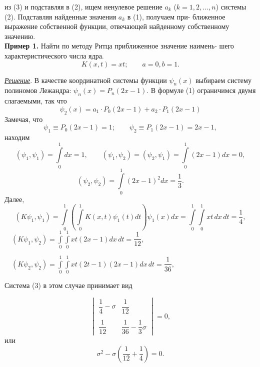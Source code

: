 \documentclass[9pt, a5paper]{book}
\begin{document}
\setcounter{page}{166}

\noindent из (3) и подставляя в (2), ищем ненулевое решение $a_k$ ($k = 1, 2,{}\dots{}, n$) \linebreak
системы (2). Подставляя найденные значения $a_k$ в (1), получаем при- \linebreak
ближенное выражение собственной функции, отвечающей найденному \linebreak
собственному значению. \\

{\bfseries Пример 1.} Найти по методу Ритца приближенное значение наимень- \linebreak
\indent шего характеристического числа ядра.
$$K(x, t) = xt; \qquad a = 0, b = 1.$$

\underline {\textsl {Решение}}. В качестве координатной системы функции $\psi_n(x)$ выбираем \linebreak
систему полиномов Лежандра: $\psi_n(x) = P_n(2x - 1)$. В формуле (1) ограничимся
двумя слагаемыми, так что
$$\psi_2(x) = a_1 \cdot P_0(2x - 1) + a_2 \cdot P_1(2x - 1)$$
Замечая, что
$$\psi_1 \equiv P_0(2x - 1) = 1; \qquad \psi_2 \equiv P_1(2x - 1) = 2x - 1,$$
находим
$$(\psi_1, \psi_1) = \int\limits^1_0 dx = 1, \qquad (\psi_1, \psi_2) = (\psi_2, \psi_1) = \int\limits^1_0 (2x - 1)dx = 0,$$
$$(\psi_2, \psi_2) = \int\limits^1_0 (2x-1)^2dx = \dfrac{1}{3}.$$
Далее,
$$(K\psi_1, \psi_1) = \int\limits^1_0 \left(\int\limits^1_0 K(x, t) \psi_1 (t) dt \right)\psi_1(x)dx = \int\limits^1_0 \int\limits^1_0xt\,dx\,dt = \dfrac{1}{4},$$
\qquad \ \, $\displaystyle{(K\psi_1, \psi_2) = \int\limits^1_0 \int\limits^1_0 xt(2x - 1)dx\,dt = \dfrac{1}{12},}$
\vspace{\baselineskip} \par
\noindent \qquad \ \, $\displaystyle{(K\psi_2, \psi_2) = \int\limits^1_0 \int\limits^1_0 xt(2t - 1)(2x - 1)dx\,dt = \dfrac{1}{36},}$

\vspace{\baselineskip}
Система (3) в этом случае принимает вид

\begin{equation*}
   \begin{vmatrix} 
   \dfrac{1}{4} - \sigma & \dfrac{1}{12} \\
   \\
   \dfrac{1}{12} & \dfrac{1}{36}-\dfrac{1}{3}\sigma
   \end{vmatrix} 
   = 0,
\end{equation*}
или
$$\sigma^2 - \sigma\left(\dfrac{1}{12} + \dfrac{1}{4}\right) = 0.$$
\newpage
\setcounter{page}{167}
\end{document}
